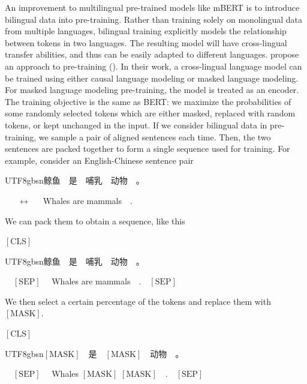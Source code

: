 An improvement to multilingual pre-trained models like mBERT is to introduce bilingual data into pre-training. Rather than training solely on monolingual data from multiple languages, bilingual training explicitly models the relationship between tokens in two languages. The resulting model will have cross-lingual transfer abilities, and thus can be easily adapted to different languages. \citet{lample-conneau:2019cross} propose an approach to pre-training  (). In their work, a cross-lingual language model can be trained using either causal language modeling or masked language modeling. For masked language modeling pre-training, the model is treated as an encoder. The training objective is the same as BERT: we maximize the probabilities of some randomly selected tokens which are either masked, replaced with random tokens, or kept unchanged in the input. If we consider bilingual data in pre-training, we sample a pair of aligned sentences each time. Then, the two sentences are packed together to form a single sequence used for training. For example, consider an English-Chinese sentence pair

\vspace{0.5em}
\begin{center}
\begin{CJK*}{UTF8}{gbsn}鲸鱼\ \ 是\ \ 哺乳\ \ 动物\ \ 。\end{CJK*}\ \ \ $\leftrightarrow$\ \ \ Whales are mammals\ \ .
\end{center}
\vspace{0.5em}

\noindent We can pack them to obtain a sequence, like this

\vspace{0.5em}
\begin{center}
$\mathrm{[CLS]}$ \begin{CJK*}{UTF8}{gbsn}鲸鱼\ \ 是\ \ 哺乳\ \ 动物\ \ 。\end{CJK*}\ \ $\mathrm{[SEP]}$ \ \ Whales are mammals\ \ .\ \ $\mathrm{[SEP]}$
\end{center}
\vspace{0.5em}

\noindent We then select a certain percentage of the tokens and replace them with $\mathrm{[MASK]}$.

\vspace{0.5em}
\begin{center}
$\mathrm{[CLS]}$ \begin{CJK*}{UTF8}{gbsn}$\mathrm{[MASK]}$\ \ 是\ \ $\mathrm{[MASK]}$\ \ 动物\ \ 。\end{CJK*}\ \ $\mathrm{[SEP]}$ \ \ Whales $\mathrm{[MASK]}$ $\mathrm{[MASK]}$\ \ .\ \ $\mathrm{[SEP]}$
\end{center}
\vspace{0.5em}

